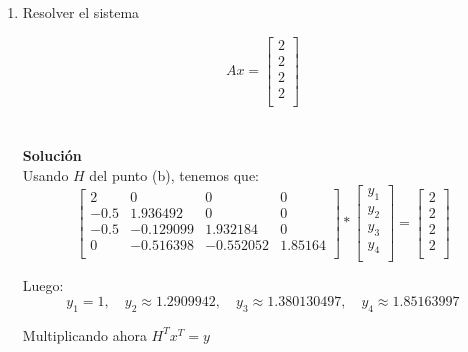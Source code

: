 \begin{enumerate}
\begin{itemize}
    \end{itemize}
    
    
    \item Resolver el sistema
    
    \[
        Ax = \begin{bmatrix}
            2\\
            2\\
            2\\
            2\\
        \end{bmatrix}
    \]
    \\\\
    
    \textbf{Solución}\\
    
    Usando $H$ del punto (b), tenemos que:
    \[
        \begin{bmatrix}
            2 & 0 & 0 & 0\\
            -0.5 & 1.936492 & 0 & 0\\
            -0.5 & -0.129099 & 1.932184 & 0 \\
            0 & -0.516398 & -0.552052 & 1.85164\\
        \end{bmatrix} * 
        \begin{bmatrix}
            y_1\\ y_2\\ y_3\\ y_4\\
        \end{bmatrix} = 
        \begin{bmatrix}
            2 \\ 2 \\ 2 \\ 2 \\
        \end{bmatrix}
    \]
    
    Luego:
    $$
    y_1 = 1, \quad y_2 \approx 1.2909942, \quad y_3 \approx 1.380130497, \quad y_4 \approx 1.85163997
    $$
    
    Multiplicando ahora $H^T x^T = y$
    

\end{enumerate}
